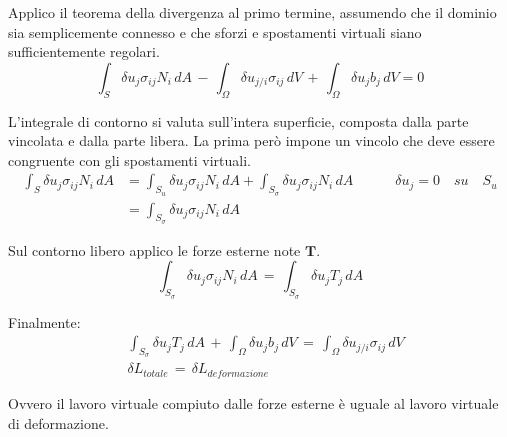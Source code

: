 Applico il teorema della divergenza al primo termine, assumendo che il dominio sia semplicemente connesso e che sforzi e spostamenti virtuali siano sufficientemente regolari.
\begin{equation*}
    \int_{S}  \delta u_j \sigma_{ij} N_i \, dA  \, -\,\int_{\Omega} \delta u_{j/i}  \sigma_{ij}  \, dV \, + \, 
    \int_{\Omega} \delta u_{j}  b_j  \, dV= 0
\end{equation*}

L'integrale di contorno si valuta sull'intera superficie, composta dalla parte vincolata e dalla parte libera. La prima però impone un vincolo che deve essere congruente con gli spostamenti virtuali.
\begin{align*}
    \int_{S}  \delta u_j \sigma_{ij} N_i \, dA  &= \int_{S_u}  \delta u_j \sigma_{ij} N_i \, dA + \int_{S_{\sigma}}  \delta u_j \sigma_{ij} N_i \, dA 
    \quad\quad\quad  \delta u_j = 0 \quad su \quad S_u\\
    & = \int_{S_{\sigma}}  \delta u_j \sigma_{ij} N_i \, dA 
\end{align*}

Sul contorno libero applico le forze esterne note $\mathbf{T}$.
\begin{equation*}
    \int_{S_{\sigma}}  \delta u_j \sigma_{ij} N_i \, dA  \, =\,   \int_{S_{\sigma}}  \delta u_j T_j \, dA 
\end{equation*}

Finalmente:
\begin{align*}
    & \int_{S_{\sigma}}  \delta u_j T_j \, dA  \, +\,\int_{\Omega} \delta u_{j}  b_j  \, dV \, = \, \int_{\Omega} \delta u_{j/i}  \sigma_{ij}  \, dV   \\
    &  \delta L_{totale} \,= \, \delta L_{deformazione}
\end{align*}

Ovvero il lavoro virtuale compiuto dalle forze esterne è uguale al lavoro virtuale di deformazione.





